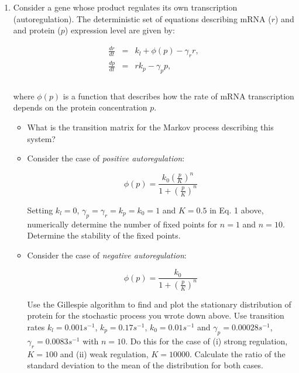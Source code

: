\documentclass[12pt]{article}
\begin{document}
\begin{enumerate}
\item Consider a gene whose product regulates its own transcription (autoregulation). The deterministic set of equations describing mRNA ($r$) and and protein ($p$) expression level are given by:

\begin{eqnarray}
\nonumber \frac{dr}{dt}&=&k_l+\phi(p)-\gamma_{r}r,\\
\nonumber \frac{dp}{dt}&=&rk_{p}-\gamma_{p}p,\\
\end{eqnarray}
\\
where $\phi(p)$ is a function that describes how the rate of mRNA transcription depends on the protein concentration $p$.

\begin{itemize} 
\item What is the transition matrix for the Markov process describing this system?
\item Consider the case of \textit{positive autoregulation}:

\begin{equation*}
\phi(p)=\frac{k_{0}\left(\frac{p}{K}\right)^n}{1+\left(\frac{p}{K}\right)^n}
\end{equation*}

Setting $k_l=0$, $\gamma_p=\gamma_r=k_p=k_0=1$ and $K=0.5$ in Eq. 1 above, numerically determine the number of fixed points for $n=1$ and $n=10$. Determine the stability of the fixed points. 

\item Consider the case of \textit{negative autoregulation}:

\begin{equation*}
\phi(p)=\frac{k_{0}}{1+\left(\frac{p}{K}\right)^n}
\end{equation*}

Use the Gillespie algorithm to find and plot the stationary distribution of protein for the stochastic process you wrote down above. Use transition rates $k_l=0.001s^{-1}$, $k_p=0.17s^{-1}$, $k_0=0.01 s^{-1}$ and $\gamma_p=0.00028 s^{-1}$,  $\gamma_r=0.0083 s^{-1}$ with $n=10$. Do this for the case of (i) strong regulation, $K=100$ and (ii) weak regulation, $K=10000$. Calculate the ratio of the standard deviation to the mean of the distribution for both cases.

\end{itemize}

\end{enumerate}
\end{document}
